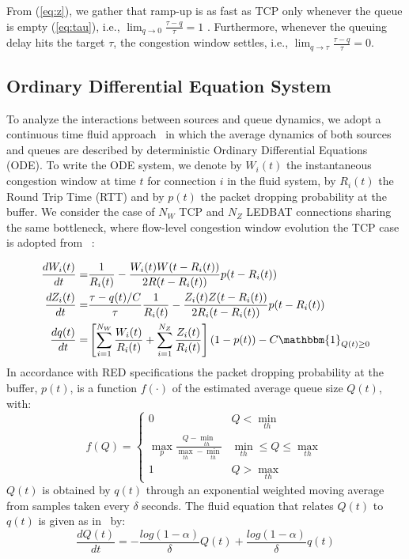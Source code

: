 \documentclass[conference]{IEEEtran}
\newcommand{\eqR}[1]{(\ref{eq:#1})}
\newcommand{\I}[1]{{\mathbbm{1}_{#1}}}
\begin{document}
From \eqR{z}, we gather that ramp-up is as fast as TCP only whenever the queue is empty \eqR{tau}, i.e., $\lim_{q\rightarrow 0} \frac{\tau-q}{\tau} = 1$ . Furthermore, whenever the queuing delay hits the target $\tau$,  the congestion window settles, i.e., $\lim_{q\rightarrow \tau} \frac{\tau-q}{\tau} = 0$.


\subsection{Ordinary Differential Equation System} 

To analyze the interactions between sources and queue dynamics, we adopt a continuous time fluid approach~\cite{misra00sigcomm,hollot01infocom,liu03sigmetrics,marsan05ton} in which the average dynamics of both sources and queues are described by deterministic Ordinary Differential Equations (ODE).
To write the ODE system, we denote by $W_i(t)$ the instantaneous congestion window at time $t$ for connection $i$ in the fluid system, by $R_i(t)$ the Round Trip Time (RTT) and by $p(t)$ the packet dropping probability at the buffer. We consider the case of $N_W$ TCP and $N_Z$ LEDBAT connections sharing the same bottleneck, where flow-level congestion window evolution the TCP case is adopted from ~\cite{misra00sigcomm}:

\begin{align}
   \frac{dW_i(t)}{dt}= & \frac{1}{R_i(t)} - \frac{W_i(t)W(t-R_i(t))}{2R(t-R_i(t))} p (t-R_i(t)) \label{eq:W} \\
   \frac{dZ_i(t)}{dt}= & \frac{\tau - q(t)/C}{\tau}\frac{1}{R_i(t)} - \frac{Z_i(t)Z(t-R_i(t))}{2R_i(t-R_i(t))}  p(t-R_i(t)) \label{eq:Z} \\
\frac{dq(t)}{dt}= & \left[\sum_{i=1}^{N_W}\frac{W_i(t)}{R_i(t)} +\sum_{i=1}^{N_Z}\frac{Z_i(t)}{R_i(t)}\right](1- p(t))  -C \I{Q(t)\ge 0}  \label{eq:q} 
\end{align}
In accordance with RED specifications the packet dropping probability at the buffer, $p(t)$, is a function $f(\cdot)$ of the estimated average queue size $Q(t)$, with: 
\[
f(Q)= \left\{
  \begin{array}{ll}  
     0  &   Q<  \min_{th} \\
     \max_p \frac{Q-\min_{th}}{\max_{th}-\min_{th} } &  \min_{th} \le Q \le  \max_{th} \\
     1  &    Q > \max_{th}  
 \end{array} \right.
\]
$Q(t)$ is obtained by $q(t)$ through an exponential weighted moving average from samples taken every $\delta$ seconds.
The fluid equation that relates $Q(t)$ to $q(t)$ is given as in~\cite{misra00sigcomm} by:
\begin{equation} 
\frac{d Q (t)}{dt}= - \frac{ log (1- \alpha)}{ \delta}  Q(t)  +   \frac{ log (1- \alpha)}{ \delta } q(t)  \label{eq:Q}
\end{equation}
\end{document}
